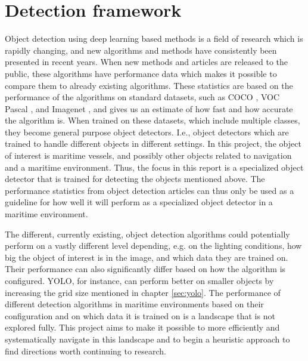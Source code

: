 \section{Detection framework}
Object detection using deep learning based methods is a field of research which is rapidly changing, and new algorithms and methods have consistently been presented in recent years. When new methods and articles are released to the public, these algorithms have performance data which makes it possible to compare them to already existing algorithms. These statistics are based on the performance of the algorithms on standard datasets, such as COCO \citep{COCO}, VOC Pascal \citep{Everingham2007} \citep{Everingham2012}, and Imagenet \citep{Imagenet}, and gives us an estimate of how fast and how accurate the algorithm is. When trained on these datasets, which include multiple classes, they become general purpose object detectors. I.e., object detectors which are trained to handle different objects in different settings. In this project, the object of interest is maritime vessels, and possibly other objects related to navigation and a maritime environment. Thus, the focus in this report is a specialized object detector that is trained for detecting the objects mentioned above. The performance statistics from object detection articles can thus only be used as a guideline for how well it will perform as a specialized object detector in a maritime environment. 

\vspace{3mm}

The different, currently existing, object detection algorithms could potentially perform on a vastly different level depending, e.g. on the lighting conditions, how big the object of interest is in the image, and which data they are trained on. Their performance can also significantly differ based on how the algorithm is configured. YOLO, for instance, can perform better on smaller objects by increasing the grid size mentioned in chapter \ref{sec:yolo}. The performance of different detection algorithms in maritime environments based on their configuration and on which data it is trained on is a landscape that is not explored fully. This project aims to make it possible to more efficiently and systematically navigate in this landscape and to begin a heuristic approach to find directions worth continuing to research.

